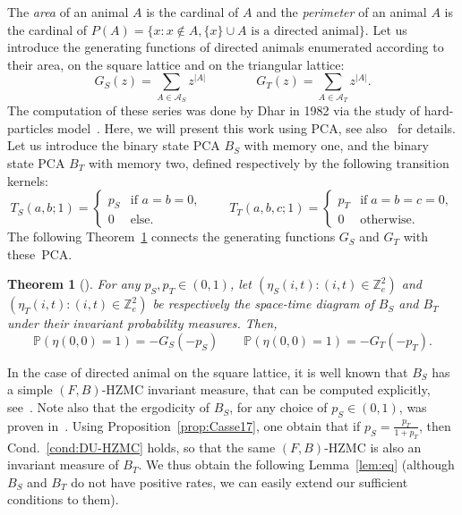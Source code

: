 \documentclass[10pt]{amsart}
\newtheorem{theo}{Theorem}[section]
\theoremstyle{definition}\newtheorem{defi}[theo]{Definition}\newtheorem{rema}[theo]{Remark}\newtheorem{exam}[theo]{Example}\newtheorem{exem}[theo]{Example}\newtheorem{nota}[theo]{Notation}
\newcounter{a}
\newcommand{\Cond}{Cond.}
\newcommand{\Z}{\mathbb{Z}}
\newcommand{\Pbb}{\mathbb{P}}
\begin{document}
The \emph{area} of an animal $A$ is the cardinal of $A$ and the \emph{perimeter} of an animal $A$ is the cardinal of $P(A) = \{x : x \notin A, \{x\} \cup A \text{ is a directed animal}\}$. Let us introduce the generating functions of directed animals enumerated according to their area, on the square lattice and on the triangular lattice:
\begin{equation*}
G_S(z) = \sum_{A \in \mathcal{A}_S} z^{|A|} \qquad \qquad G_T(z) = \sum_{A \in \mathcal{A}_T} z^{|A|}.
\end{equation*}
The computation of these series was done by Dhar in 1982 via the study of hard-particles model~\cite{Dhar82}. Here, we will present this work using PCA, see also~\cite{mm_tcs} for details. Let us introduce the binary state PCA $B_S$ with memory one, and the binary state PCA $B_T$ with memory two, defined respectively by the following transition kernels:
\[
T_S(a,b;1) =
\begin{cases}
p_S & \text{if } a=b=0,\\
0 & \text{else}.
\end{cases}
\qquad T_T(a,b,c;1) =
\begin{cases}
p_T & \text{if} \; a=b=c=0,\\
0 & \text{otherwise}.
\end{cases}
\]
The following Theorem~\ref{theo:Dhar82} connects the generating functions $G_S$ and $G_T$ with these~PCA.

\begin{theo}[\cite{Dhar82,BousquetMelou98,LBM07}] \label{theo:Dhar82}
For any $p_S, p_T\in (0,1)$, let $(\eta_S(i,t): (i,t) \in \Z_{e}^2)$ and $(\eta_T(i,t): (i,t) \in \Z_{e}^2)$ be respectively the space-time diagram of $B_S$ and $B_T$ under their invariant probability measures. Then,
\begin{equation*}
\Pbb\left(\eta(0,0) = 1 \right) = - G_S(-p_S) \qquad \Pbb\left(\eta(0,0) = 1 \right) = - G_T(-p_T).
\end{equation*}
\end{theo}

In the case of directed animal on the square lattice, it is well known that $B_S$ has a simple $(F,B)$-HZMC invariant measure, that can be computed explicitly, see~\cite{BousquetMelou98,CM15,Dhar82,LBM07}. Note also that the ergodicity of $B_S$, for any choice of $p_S\in(0,1)$, was proven in~\cite{hmm}. Using Proposition~\ref{prop:Casse17}, one obtain that if $ p_S = \frac{p_T}{1+p_T}$, then \Cond~\ref{cond:DU-HZMC} holds, so that the same $(F,B)$-HZMC is also an invariant measure of $B_T$. We thus obtain the following Lemma~\ref{lem:eq} (although $B_S$ and $B_T$ do not have positive rates, we can easily extend our sufficient conditions to them).
\end{document}
